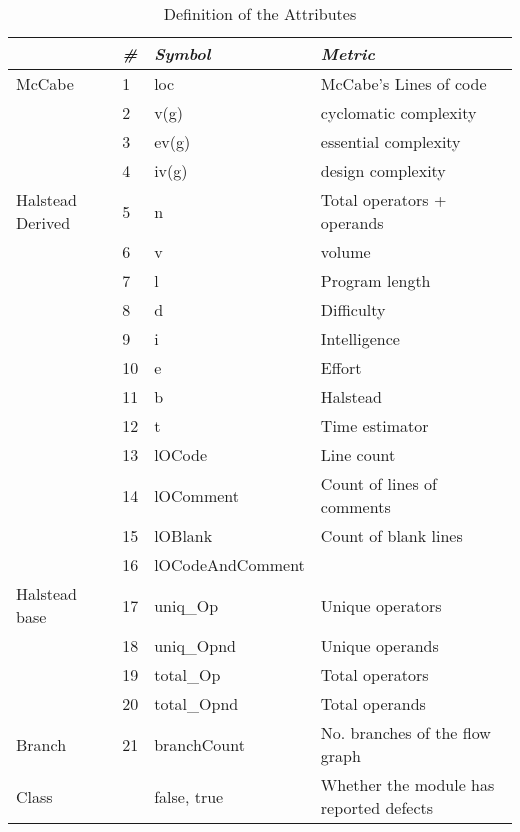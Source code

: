 \documentclass{elsart}
\begin{document}
\begin{table}%
\begin{center}
\begin{scriptsize}
\caption{Definition of the Attributes}
\begin{tabular}{l|l|l|l}
\hline
          &   \emph{\#} & \emph{Symbol} &  \emph{Metric} \\
\hline
\hline
    McCabe  &          1 &         loc  &  McCabe's  Lines of code \\
\hline
            &          2 &        v(g)  &  cyclomatic complexity \\
            &          3 &       ev(g)  &  essential complexity \\
            &          4 &       iv(g)  &  design complexity \\
\hline
Halstead Derived  &    5 &           n  &  Total operators + operands \\
                  &    6 &           v  &      volume \\
                  &    7 &           l  &  Program length \\
                  &    8 &           d  &  Difficulty \\
                  &    9 &           i  &  Intelligence \\
                  &   10 &           e  &  Effort \\
                  &   11 &           b  &   Halstead \\
                  &   12 &           t  &  Time estimator \\
                  &   13 &      lOCode  &  Line count \\
                  &   14 &   lOComment  &  Count of lines of comments \\
                  &   15 &     lOBlank  &  Count of blank lines \\
                  &   16 &   lOCodeAndComment  &             \\
\hline
Halstead base  &      17 &     uniq\_Op  &  Unique operators \\
               &      18 &   uniq\_Opnd  &  Unique operands \\
               &      19 &    total\_Op  &  Total operators \\
               &      20 &   total\_Opnd  &  Total operands \\
\hline
     Branch  &        21 &   branchCount  &  No. branches of the flow graph \\
\hline
     Class  &            &     {false, true}  &  Whether the module has reported defects \\
\hline
\end{tabular}
\end{scriptsize}
 \label{tab:attrDef}
 \end{center}
\end{table}
\end{document}
